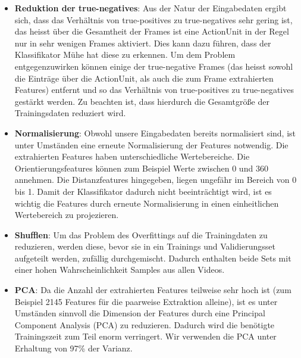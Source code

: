 \begin{itemize}
  \item \textbf{Reduktion der true-negatives}: Aus der Natur der Eingabedaten ergibt sich, dass das Verhältnis von true-positives zu true-negatives sehr gering ist, das heisst
        über die Gesamtheit der Frames ist eine ActionUnit in der Regel nur in sehr wenigen Frames aktiviert. Dies kann dazu führen, dass der Klassifikator Mühe hat diese zu erkennen.
        Um dem Problem entgegenzuwirken können einige der true-negative Frames (das heisst sowohl die Einträge über die ActionUnit, als auch die zum Frame extrahierten Features) entfernt
        und so das Verhältnis von true-positives zu true-negatives gestärkt werden. Zu beachten ist, dass hierdurch die Gesamtgröße der Trainingsdaten reduziert wird.

  \item \textbf{Normalisierung}: Obwohl unsere Eingabedaten bereits normalisiert sind, ist unter Umständen eine erneute Normalisierung der Features notwendig. Die extrahierten
        Features haben unterschiedliche Wertebereiche. Die Orientierungsfeatures können zum Beispiel Werte zwischen 0 und 360 annehmen. Die Distanzfeatures hingegeben, liegen
        ungefähr im Bereich von 0 bis 1. Damit der Klassifikator dadurch nicht beeinträchtigt wird, ist es wichtig die Features durch erneute Normalisierung in einen einheitlichen
        Wertebereich zu projezieren.

  \item \textbf{Shufflen}: Um das Problem des Overfittings auf die Trainingdaten zu reduzieren, werden diese, bevor sie in ein Trainings und Validierungsset aufgeteilt werden,
        zufällig durchgemischt. Dadurch enthalten beide Sets mit einer hohen Wahrscheinlichkeit Samples aus allen Videos.

  \item \textbf{PCA}: Da die Anzahl der extrahierten Features teilweise sehr hoch ist (zum Beispiel 2145 Features für die paarweise Extraktion alleine), ist es unter Umständen
    sinnvoll die Dimension der Features durch eine Principal Component Analysis (PCA) zu reduzieren. Dadurch wird die benötigte Trainingszeit zum Teil enorm verringert. Wir
        verwenden die PCA unter Erhaltung von 97\% der Varianz.
\end{itemize}

